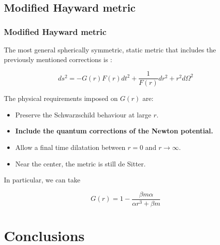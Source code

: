 \documentclass{beamer}
\begin{document}
\subsection{Modified Hayward metric}

\begin{frame}
\frametitle{Modified Hayward metric}
The most general spherically symmetric, static metric that includes the previously mentioned corrections is \cite{effective}:

\begin{equation}
ds^2 = -G(r)F(r)dt^2 + \frac{1}{F(r)}dr^2 + r^2d\Omega^2
\end{equation}

The physical requirements imposed on $G(r)$ are:

\begin{itemize}
\item Preserve the Schwarzschild behaviour at large $r$.
\item \textbf{Include the quantum corrections of the Newton potential.}
\item Allow a final time dilatation between $r = 0$ and $r \rightarrow \infty$.
\item Near the center, the metric is still de Sitter.	
\end{itemize}

In particular, we can take

\begin{equation}
G(r) = 1 - \frac{\beta m \alpha}{\alpha r^3 + \beta m}
\end{equation}

\end{frame}

\section{Conclusions}
\end{document}
